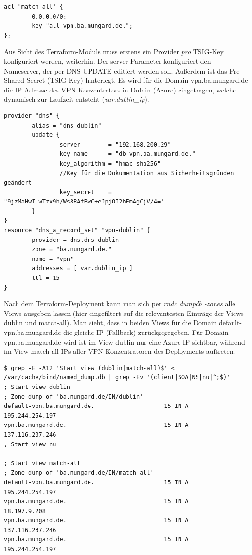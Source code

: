 \begin{lstlisting}[label=view-matchall-bind,caption=.]
acl "match-all" {
        0.0.0.0/0;
        key "all-vpn.ba.mungard.de.";
};
\end{lstlisting}


Aus Sicht des Terraform-Moduls muss erstens ein Provider \textit{pro} TSIG-Key konfiguriert werden, weiterhin. Der server-Parameter konfiguriert den Nameserver, der per DNS UPDATE editiert werden soll. Außerdem ist das Pre-Shared-Secret (TSIG-Key) hinterlegt. Es wird für die Domain vpn.ba.mungard.de die IP-Adresse des VPN-Konzentrators in Dublin (Azure) eingetragen, welche dynamisch zur Laufzeit entsteht (\textit{var.dublin\_ip}).

\begin{lstlisting}[label=tf-provider-dns,caption=.]
provider "dns" {
        alias = "dns-dublin"
        update {
                server        = "192.168.200.29"
                key_name      = "db-vpn.ba.mungard.de."
                key_algorithm = "hmac-sha256"
                //Key für die Dokumentation aus Sicherheitsgründen geändert
                key_secret    = "9jzMaHwILwTzx9b/Ws8RAfBwC+eJpjOI2hEmAgCjV/4="
        }
}
resource "dns_a_record_set" "vpn-dublin" {
        provider = dns.dns-dublin
        zone = "ba.mungard.de."
        name = "vpn"
        addresses = [ var.dublin_ip ]
        ttl = 15
}
\end{lstlisting}

Nach dem Terraform-Deployment kann man sich per \textit{rndc dumpdb -zones} alle Views ausgeben lassen (hier eingefiltert auf die relevantesten Einträge der Views \glqq dublin\grqq{} und \glqq match-all\grqq{}). Man sieht, dass in beiden Views für die Domain default-vpn.ba.mungard.de die gleiche IP (\glqq Fallback\grqq{}) zurückgegegeben. Für Domain vpn.ba.mungard.de wird ist im View \glqq dublin\grqq{} nur eine Azure-IP sichtbar, während im View \glqq match-all\grqq{} IPs aller VPN-Konzentratoren des Deployments auftreten.

\begin{lstlisting}[label=tf-provider-dns,caption=.]
$ grep -E -A12 'Start view (dublin|match-all)$' < /var/cache/bind/named_dump.db | grep -Ev '(client|SOA|NS|nu|^;$)'
; Start view dublin
; Zone dump of 'ba.mungard.de/IN/dublin'
default-vpn.ba.mungard.de.                    15 IN A           195.244.254.197
vpn.ba.mungard.de.                            15 IN A           137.116.237.246
; Start view nu
--
; Start view match-all
; Zone dump of 'ba.mungard.de/IN/match-all'
default-vpn.ba.mungard.de.                    15 IN A           195.244.254.197
vpn.ba.mungard.de.                            15 IN A           18.197.9.208
vpn.ba.mungard.de.                            15 IN A           137.116.237.246
vpn.ba.mungard.de.                            15 IN A           195.244.254.197
\end{lstlisting}

